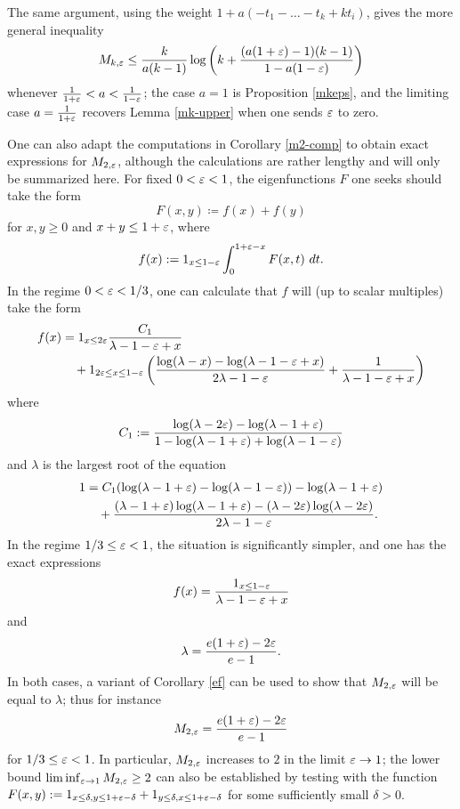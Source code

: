 \begin{remark} The same argument, using the weight $1 + a(-t_1-\dots-t_k + kt_i)$, gives the more general inequality
$$ M_{k,\varepsilon} \leq \frac{k}{a(k-1)} \log\left(k + \frac{(a(1+\varepsilon)-1)(k-1)}{1-a(1-\varepsilon)} \right)$$
whenever $\frac{1}{1+\varepsilon} < a < \frac{1}{1-\varepsilon}$; the case $a=1$ is Proposition \ref{mkeps}, and the limiting case $a=\frac{1}{1+\varepsilon}$ recovers Lemma \ref{mk-upper} when one sends $\varepsilon$ to zero.
\end{remark}

One can also adapt the computations in Corollary \ref{m2-comp} to obtain exact expressions for $M_{2,\varepsilon}$, although the calculations are rather lengthy and will only be summarized here.  For fixed $0 < \varepsilon < 1$, the eigenfunctions $F$ one seeks should take the form
$$ F(x,y) \coloneqq f(x) + f(y)$$
for $x,y \geq 0$ and $x+y \leq 1+\varepsilon$, where
$$ f(x) := 1_{x \leq 1-\varepsilon} \int_0^{1+\varepsilon-x} F(x,t)\ dt.$$
In the regime $0 < \varepsilon < 1/3$, one can calculate that $f$ will (up to scalar multiples) take the form
\begin{align*}
 f(x) &= 1_{x \leq 2\varepsilon} \frac{C_1}{\lambda-1-\varepsilon+x} \\
&\quad + 1_{2\varepsilon \leq x \leq 1-\varepsilon} \left(\frac{\log(\lambda-x)-\log(\lambda-1-\varepsilon+x)}{2\lambda-1-\varepsilon} + \frac{1}{\lambda-1-\varepsilon+x} \right)
\end{align*}
where
$$ C_1 := \frac{\log(\lambda-2\varepsilon) - \log(\lambda-1+\varepsilon)}{1 - \log(\lambda-1+\varepsilon) + \log(\lambda-1-\varepsilon)} $$
and $\lambda$ is the largest root of the equation
\begin{align*}
 1 &= C_1 ( \log(\lambda-1+\varepsilon) - \log(\lambda-1-\varepsilon)) - \log(\lambda-1+\varepsilon) \\
&\quad + \frac{ (\lambda-1+\varepsilon) \log(\lambda-1+\varepsilon) - (\lambda-2\varepsilon) \log(\lambda-2\varepsilon) }{2\lambda-1-\varepsilon}.
\end{align*}
In the regime $1/3 \leq \varepsilon < 1$, the situation is significantly simpler, and one has the exact expressions
$$ f(x) = \frac{1_{x \leq 1-\varepsilon}}{\lambda - 1 - \varepsilon + x}$$
and 
$$ \lambda = \frac{e(1+\varepsilon)-2\varepsilon}{e-1}.$$
In both cases, a variant of Corollary \ref{ef} can be used to show that $M_{2,\varepsilon}$ will be equal to $\lambda$; thus for instance
$$ M_{2,\varepsilon} = \frac{e(1+\varepsilon)-2\varepsilon}{e-1}$$
for $1/3 \leq \varepsilon < 1$.  In particular, $M_{2,\varepsilon}$ increases to $2$ in the limit $\varepsilon \to 1$; the lower bound $\liminf_{\varepsilon \to 1} M_{2,\varepsilon} \geq 2$ can also be established by testing with the function $F(x,y) := 1_{x \leq \delta, y \leq 1+\varepsilon-\delta} + 1_{y \leq \delta, x \leq 1+\varepsilon-\delta}$ for some sufficiently small $\delta>0$.

